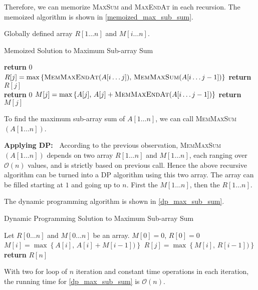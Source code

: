 \begin{homeworkProblem}
Therefore, we can memorize \textsc{MaxSum} and \textsc{MaxEndAt} in each recursion.
The memoized algorithm is shown in \cref{memoized_max_sub_sum}.

Globally defined array $R[1 \ldots n]$ and $M[i \ldots n]$.

\begin{algorithm}[H]
    \caption{Memoized Solution to Maximum Sub-array Sum}\label{memoized_max_sub_sum}
    \begin{algorithmic}[1]
                \State \textbf{return } $0$
            \EndIf
            \State $R[j] = \max\left\{\text{\textsc{MemMaxEndAt}}(A[i\ldots j])\text{,\ }\text{\textsc{MemMaxSum}}(A[i\ldots j-1])\right\}$
            \EndIf
            \State \textbf{return } $R[j]$
        \EndProcedure
        \\\hrulefill
                \State \textbf{return } $0$
            \EndIf
            \State $M[j] = \max\left\{A[j]\text{,\ }A[j] + \text{\textsc{MemMaxEndAt}}(A[i\ldots j-1])\right\}$
            \EndIf
            \State \textbf{return } $M[j]$
        \EndProcedure
    \end{algorithmic}
\end{algorithm}

To find the maximum sub-array sum of $A[1\ldots n]$, we can call \textsc{MemMaxSum}$(A[1\ldots n])$.

\pagebreak
\noindent
\textbf{Applying DP:\ }
According to the previous observation, \textsc{MemMaxSum}$(A[1\ldots n])$ depends on two array 
$R[1\ldots n]$ and $M[1\ldots n]$, each ranging over $\mathcal{O}(n)$ values, and is strictly
based on previous call. Hence the above recursive algorithm can be turned into a DP
algorithm using this two array. The array can be filled starting at $1$ and going up to $n$.
First the $M[1\ldots n]$, then the $R[1\dots n]$.

The dynamic programming algorithm is shown in \cref{dp_max_sub_sum}.

\begin{algorithm}[H]
    \caption{Dynamic Programming Solution to Maximum Sub-array Sum}\label{dp_max_sub_sum}
    \begin{algorithmic}[1]
            \State Let $R[0\ldots n]$ and $M[0\ldots n]$ be an array.
            \State $M[0] = 0$, $R[0] = 0$
                \State $M[i] = \max\left\{A[i]\text{,\ }A[i] + M[i-1])\right\}$
            \EndFor
                \State $R[j] = \max\left\{M[i]\text{,\ }R[i-1])\right\}$
            \EndFor
            \State \textbf{return }$R[n]$
        \EndProcedure
    \end{algorithmic}
\end{algorithm}

With two for loop of $n$ iteration and constant time operations in each iteration, the running time for \cref{dp_max_sub_sum} is $\mathcal{O}(n)$.

\end{homeworkProblem}
